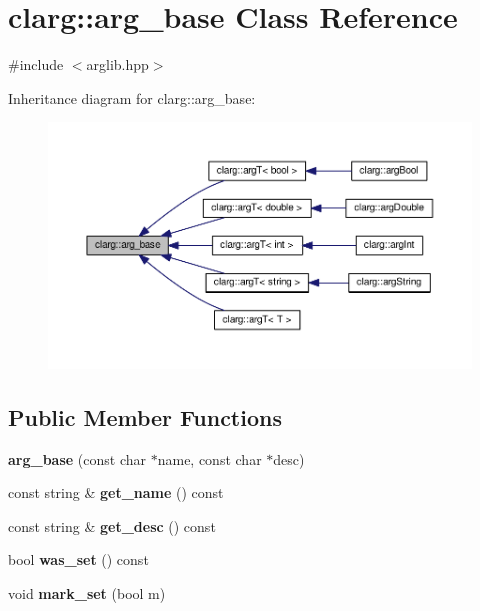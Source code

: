 \hypertarget{classclarg_1_1arg__base}{}\section{clarg\+:\+:arg\+\_\+base Class Reference}
\label{classclarg_1_1arg__base}


{\ttfamily \#include $<$arglib.\+hpp$>$}



Inheritance diagram for clarg\+:\+:arg\+\_\+base\+:\nopagebreak
\begin{figure}[H]
\begin{center}
\leavevmode
\includegraphics[width=350pt]{classclarg_1_1arg__base__inherit__graph}
\end{center}
\end{figure}
\subsection*{Public Member Functions}
\begin{DoxyCompactItemize}
\item 
{\bfseries arg\+\_\+base} (const char $\ast$name, const char $\ast$desc)\hypertarget{classclarg_1_1arg__base_a7a37ba86e5e5e73b86af0e91e704bc4d}{}\label{classclarg_1_1arg__base_a7a37ba86e5e5e73b86af0e91e704bc4d}

\item 
const string \& {\bfseries get\+\_\+name} () const \hypertarget{classclarg_1_1arg__base_a021c1fabeb75a62b7babb578b5e7d187}{}\label{classclarg_1_1arg__base_a021c1fabeb75a62b7babb578b5e7d187}

\item 
const string \& {\bfseries get\+\_\+desc} () const \hypertarget{classclarg_1_1arg__base_a4a2513e871d1fa654838bc9fe47f84b7}{}\label{classclarg_1_1arg__base_a4a2513e871d1fa654838bc9fe47f84b7}

\item 
bool {\bfseries was\+\_\+set} () const \hypertarget{classclarg_1_1arg__base_aa92067620e266422f44243c7b247782f}{}\label{classclarg_1_1arg__base_aa92067620e266422f44243c7b247782f}

\item 
void {\bfseries mark\+\_\+set} (bool m)\hypertarget{classclarg_1_1arg__base_a339f03baa455901e1eed0708da3e8ce4}{}\label{classclarg_1_1arg__base_a339f03baa455901e1eed0708da3e8ce4}

\end{DoxyCompactItemize}
